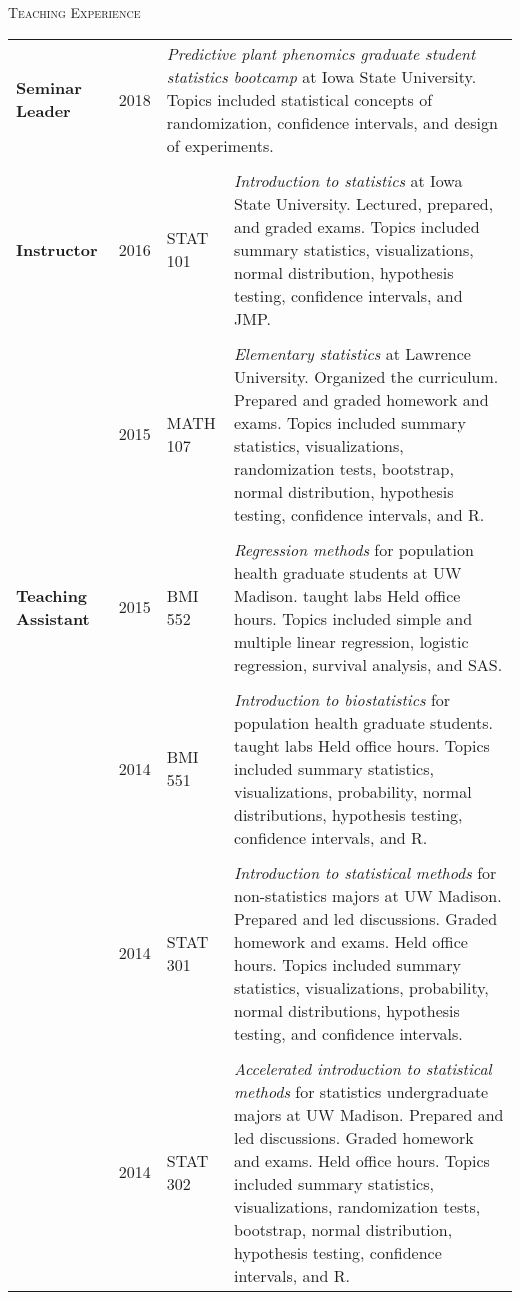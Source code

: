 \documentclass[10pt, oneside]{article}
\begin{document}
\noindent \textsc{Teaching Experience} \hrulefill
\begin{longtable}{p{2cm}p{1cm}p{2cm}p{11.5cm}}
\textbf{Seminar Leader} & \hfill{2018} & \multicolumn{2}{p{13.5cm}}{\emph{Predictive plant phenomics graduate student statistics bootcamp} at Iowa State University. Topics included statistical concepts of randomization, confidence intervals, and design of experiments.}\\
\\
\textbf{Instructor} & \hfill{2016} & STAT 101 & \emph{Introduction to statistics} at Iowa State University. Lectured, prepared, and graded exams. Topics included summary statistics, visualizations, normal distribution, hypothesis testing, confidence intervals, and JMP.\\
\\
& \hfill{2015} & MATH 107 & \emph{Elementary statistics} at Lawrence University. Organized the curriculum. Prepared and graded homework and exams. Topics included summary statistics, visualizations, randomization tests, bootstrap, normal distribution, hypothesis testing, confidence intervals, and R.\\
\\
\textbf{Teaching Assistant} & \hfill{2015} & BMI 552 & \emph{Regression methods} for population health graduate students at UW Madison. taught labs Held office hours. Topics included simple and multiple linear regression, logistic regression, survival analysis, and SAS.\\
\\
& \hfill{2014} & BMI 551 & \emph{Introduction to biostatistics} for population health graduate students. taught labs Held office hours. Topics included summary statistics, visualizations, probability, normal distributions, hypothesis testing, confidence intervals, and R.\\
\\
& \hfill{2014} & STAT 301 & \emph{Introduction to statistical methods} for non-statistics majors at UW Madison. Prepared and led discussions. Graded homework and exams. Held office hours. Topics included summary statistics, visualizations, probability, normal distributions, hypothesis testing, and confidence intervals.\\
\\
& \hfill{2014} & STAT 302 & \emph{Accelerated introduction to statistical methods} for statistics undergraduate majors at UW Madison. Prepared and led discussions. Graded homework and exams. Held office hours. Topics included summary statistics, visualizations, randomization tests, bootstrap, normal distribution, hypothesis testing, confidence intervals, and R.\\

\end{longtable}
\end{document}
